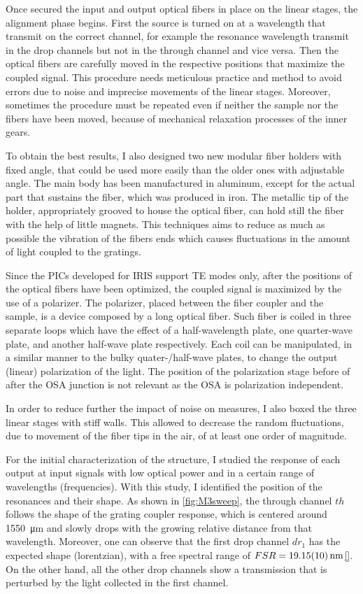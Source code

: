 Once secured the input and output optical fibers in place on the linear stages, the alignment phase begins.
First the source is turned on at a wavelength that transmit on the correct channel, for example the resonance wavelength transmit in the drop channels but not in the through channel and vice versa.
Then the optical fibers are carefully moved in the respective positions that maximize the coupled signal.
This procedure needs meticulous practice and method to avoid errors due to noise and imprecise movements of the linear stages.
Moreover, sometimes the procedure must be repeated even if neither the sample nor the fibers have been moved, because of mechanical relaxation processes of the inner gears.

To obtain the best results, I also designed two new modular fiber holders with fixed angle, that could be used more easily than the older ones with adjustable angle.
The main body has been manufactured in aluminum, except for the actual part that sustains the fiber, which was produced in iron.
The metallic tip of the holder, appropriately grooved to house the optical fiber, can hold still the fiber with the help of little magnets.
This techniques aims to reduce as much as possible the vibration of the fibers ends which causes fluctuations in the amount of light coupled to the gratings.

Since the \acp{PIC} developed for IRIS support \acs{TE} modes only, after the positions of the optical fibers have been optimized, the coupled signal is maximized by the use of a polarizer.
The polarizer, placed between the fiber coupler and the sample, is a device composed by a long optical fiber.
Such fiber is coiled in three separate loops which have the effect of a half-wavelength plate, one quarter-wave plate, and another half-wave plate respectively.
Each coil can be manipulated, in a similar manner to the bulky quater-/half-wave plates, to change the output (linear) polarization of the light.
The position of the polarization stage before of after the \ac{OSA} junction is not relevant as the \ac{OSA} is polarization independent.

In order to reduce further the impact of noise on measures, I also boxed the three linear stages with stiff walls.
This allowed to decrease the random fluctuations, due to movement of the fiber tips in the air, of at least one order of magnitude.

For the initial characterization of the structure, I studied the response of each output at input signals with low optical power and in a certain range of wavelengths (frequencies).
With this study, I identified the position of the resonances and their shape.
As shown in \autoref{fig:M3sweep}, the through channel $th$ follows the shape of the grating coupler response, which is centered around \SI{1550}{\um} and slowly drops with the growing relative distance from that wavelength.
Moreover, one can observe that the first drop channel $dr_1$ has the expected shape (lorentzian), with a free spectral range of $FSR=\SI{19.15+-.1}{\nm}$\ref{}.
On the other hand, all the other drop channels show a transmission that is perturbed by the light collected in the first channel.

